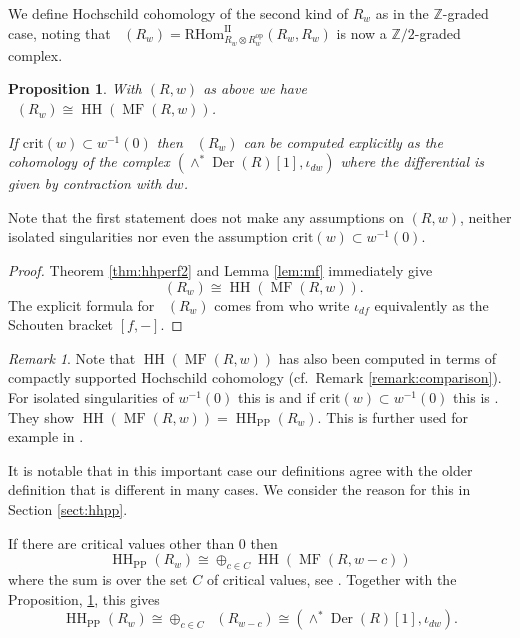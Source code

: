 \documentclass[a4paper]{amsart}
\theoremstyle{plain}
\newtheorem{prop}[thm]{Proposition}
\theoremstyle{definition}
\theoremstyle{remark}
\newtheorem{rem}[thm]{Remark}
\newcommand{\Z}{\mathbb{Z}}
\DeclareMathOperator{\MF}{MF}
\DeclareMathOperator{\HH}{HH}
\DeclareMathOperator{\HHII}{HH^{\mathrm{II}}}
\newcommand{\RHomII}{\mathrm{RHom}^{\mathrm{II}}}
\newcommand{\op}{\mathrm{op}}
\numberwithin{equation}{section}
\theoremstyle{plain}
\begin{document}
	We define Hochschild cohomology of the  second kind of $R_w$ as in the $\Z$-graded case, noting that 
	$\HHII(R_w) = \RHomII_{R_w \otimes R_w^{\op}} (R_w, R_w)$ is now a $\Z/2$-graded complex.
	
	\begin{prop}\label{prop:MF}
		With $(R,w)$ as above we have $\HHII(R_w) \cong \HH(\MF(R,w))$.
		
		If $\mathrm{crit}(w) \subset w^{-1}(0)$ then $\HHII(R_w)$ can be computed explicitly as the cohomology of the complex $(\wedge^* \operatorname{Der}(R)[1], \iota_{dw})$ where the differential is given by contraction with $dw$.
	\end{prop}
	Note that the first statement does not make any assumptions on $(R,w)$, neither isolated singularities nor even the assumption $\mathrm{crit}(w) \subset w^{-1}(0)$.
	\begin{proof}
		Theorem \ref{thm:hhperf2} and Lemma \ref{lem:mf} immediately give \[\HHII(R_w) \cong \HH(\MF(R,w)).\]
		The explicit formula for $\HHII(R_w)$ comes from \cite[Theorem 3.1]{lin2013global} who write $\iota_{df}$ equivalently as the Schouten bracket $[f,-]$.
	\end{proof}
	
	\begin{rem}\label{rem:mfhhppagree}
		Note that $\HH(\MF(R,w))$ has also been computed in terms of compactly supported Hochschild cohomology (cf.\ Remark \ref{remark:comparison}). 
		For isolated singularities of $w^{-1}(0)$ this is \cite{caldararu2013curved, tu2014matrix} 
		and if $\mathrm{crit}(w) \subset w^{-1}(0)$ this is
		\cite[Section 4.8]{pp12}.
		They show $\HH(\MF(R,w)) = 
		\HH_{\mathrm{PP}}(R_w)$. 
		This is further used for example in \cite{efimov2018cyclic}.
		
		It is notable that in this important case our definitions agree with the older definition that is different in many cases. We consider the reason for this in Section \ref{sect:hhpp}.
		
		If there are critical values other than $0$ then  $$\HH_{\mathrm{PP}}(R_w) \cong \oplus_{c \in C} \HH(\MF(R, w-c))$$
		where the sum is over the set $C$ of critical values, see \cite[Section 4.10]{pp12}.
		Together with the Proposition, \ref{prop:MF}, this gives
		$$\HH_{\mathrm{PP}}(R_w) \cong \oplus_{c \in C} \HHII(R_{ w-c}) \cong (\wedge^* \operatorname{Der}(R)[1], \iota_{dw}).$$	
	\end{rem}
	
	
\end{document}
